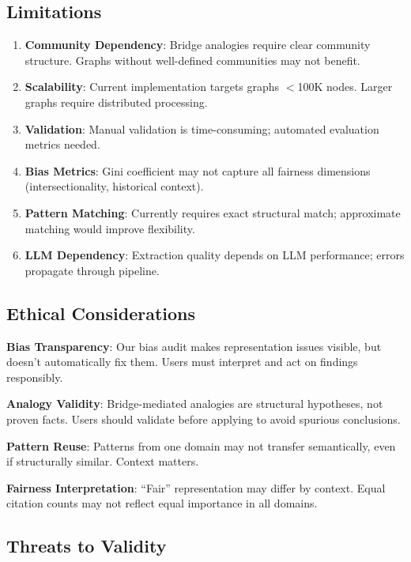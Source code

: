 \documentclass[11pt,twocolumn]{article}
\begin{document}
\subsection{Limitations}

\begin{enumerate}
\item \textbf{Community Dependency}: Bridge analogies require clear community structure. Graphs without well-defined communities may not benefit.

\item \textbf{Scalability}: Current implementation targets graphs $<$100K nodes. Larger graphs require distributed processing.

\item \textbf{Validation}: Manual validation is time-consuming; automated evaluation metrics needed.

\item \textbf{Bias Metrics}: Gini coefficient may not capture all fairness dimensions (intersectionality, historical context).

\item \textbf{Pattern Matching}: Currently requires exact structural match; approximate matching would improve flexibility.

\item \textbf{LLM Dependency}: Extraction quality depends on LLM performance; errors propagate through pipeline.
\end{enumerate}

\subsection{Ethical Considerations}

\textbf{Bias Transparency}: Our bias audit makes representation issues visible, but doesn't automatically fix them. Users must interpret and act on findings responsibly.

\textbf{Analogy Validity}: Bridge-mediated analogies are structural hypotheses, not proven facts. Users should validate before applying to avoid spurious conclusions.

\textbf{Pattern Reuse}: Patterns from one domain may not transfer semantically, even if structurally similar. Context matters.

\textbf{Fairness Interpretation}: ``Fair'' representation may differ by context. Equal citation counts may not reflect equal importance in all domains.

\subsection{Threats to Validity}
\end{document}
